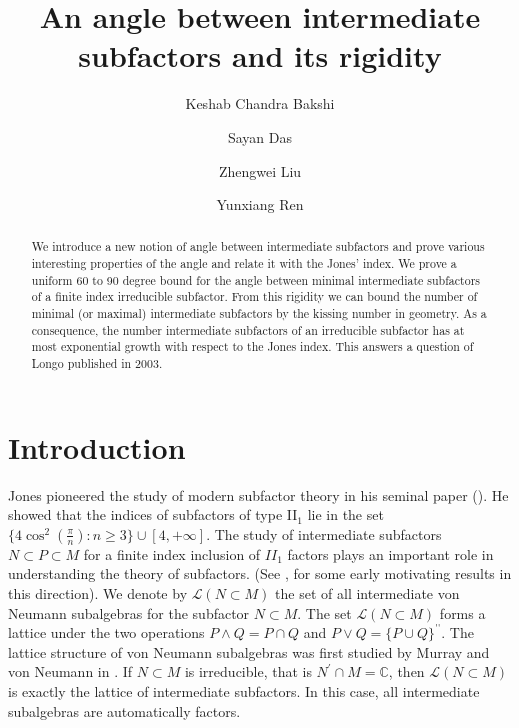 \documentclass[11pt,letterpaper]{amsart}
\theoremstyle{definition}
\theoremstyle{remark}
\DeclareMathOperator*{\dprime}{\prime \prime}
\begin{document}
\title{An angle between intermediate subfactors and its rigidity}

\author{Keshab Chandra Bakshi}
\address{The Institute of Mathematical Sciences, Chennai, India}
\author{Sayan Das}
\address{Department of Mathematics\\ The University of Iowa}
\author{Zhengwei Liu}
\address{Department of Mathematics and Department of Physics\\ Harvard University}
\author{Yunxiang Ren}
\address{Department of Mathematics\\ University of the Tennessee}


\begin{abstract}
We introduce a new notion of angle between intermediate subfactors and prove various interesting properties of the angle and relate it with the Jones' index. 
We prove a uniform 60 to 90 degree bound for the angle between minimal intermediate subfactors of a finite index irreducible subfactor. From this rigidity we can bound the number of minimal (or maximal) intermediate subfactors by the kissing number in geometry. As a consequence, the number intermediate subfactors of an irreducible subfactor has at most exponential growth with respect to the Jones index. This answers a question of Longo published in 2003.


\end{abstract}

\maketitle
\section{Introduction}
Jones pioneered the study of modern subfactor theory in his seminal paper (\cite{Jo1}). He showed that the indices of subfactors of type II$_1$ lie in the set
$
\{4\cos^2(\frac{\pi}{n}):n\geq3\}\cup[4,+\infty].
$
The study of intermediate subfactors $N \subset P \subset M$ for a finite index inclusion of $II_1$ factors plays an important role in understanding the theory of subfactors. (See \cite{Bi1}, \cite{BiJo1} for some early motivating results in this direction). 
We denote by $\mathcal{L}(N\subset M)$ the set of all intermediate von Neumann subalgebras for the subfactor $N\subset M$. The set $\mathcal{L}(N\subset M)$ forms a lattice under the two operations
$P\wedge Q= P\cap Q$ and $P\vee Q=\{P\cup Q\}^{\dprime}$. The lattice structure of von Neumann subalgebras was first studied by
Murray and von Neumann in \cite{MaVo}.  If $N\subset M$ is irreducible, that is $N^{\prime}\cap M= \mathbb{C}$, then $\mathcal{L}(N\subset M)$ is exactly 
the lattice of intermediate subfactors. In this case, all intermediate subalgebras are automatically factors. 
\end{document}
